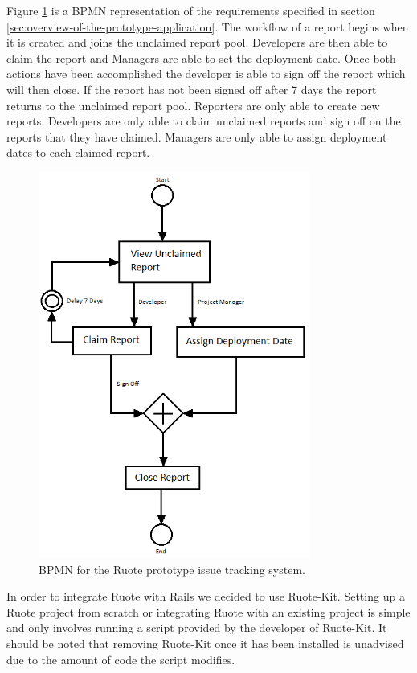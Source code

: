 \documentclass[document.tex]{subfiles}
\begin{document}
Figure \ref{fig:ruote-bpmn-diagram} is a BPMN representation of the requirements specified in section \ref{sec:overview-of-the-prototype-application}. The workflow of a report begins when it is created and joins the unclaimed report pool. Developers are then able to claim the report and Managers are able to set the deployment date. Once both actions have been accomplished the developer is able to sign off the report which will then close. If the report has not been signed off after 7 days the report returns to the unclaimed report pool. Reporters are only able to create new reports. Developers are only able to claim unclaimed reports and sign off on the reports that they have claimed. Managers are only able to assign deployment dates to each claimed report.

\begin{figure}[!ht]
\centering \includegraphics[height=5in]{./img/prototypes/ruote-bpmn-diagram}
\caption{BPMN for the Ruote prototype issue tracking system.}
\label{fig:ruote-bpmn-diagram}
\end{figure}

In order to integrate Ruote with Rails we decided to use Ruote-Kit. Setting up a Ruote project from scratch or integrating Ruote with an existing project is simple and only involves running a script provided by the developer of Ruote-Kit. It should be noted that removing Ruote-Kit once it has been installed is unadvised due to the amount of code the script modifies.
\end{document}
